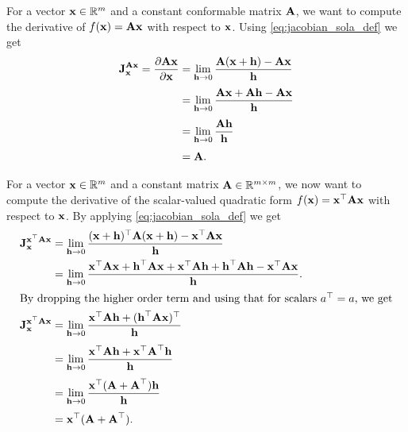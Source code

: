\begin{example}[frametitle=Computing the Jacobian $\jac{\matA \vecx}{\vecx}$]
For a vector $\vecx \in \bbR^m$ and a constant conformable matrix $\matA$, we want to compute the derivative of $f(\vecx) = \matA \vecx$ with respect to $\vecx$.
Using \eqref{eq:jacobian_sola_def} we get
\begin{subequations}
\begin{align}
  \jac{\matA \vecx}{\vecx} = \dpar{\matA \vecx}{\vecx} 
  &= \lim_{\vech \to 0} \frac{\matA (\vecx + \vech) - \matA \vecx}{\vech}\\[0.3em]
  &= \lim_{\vech \to 0} \frac{\matA \vecx + \matA \vech - \matA \vecx}{\vech}\\[0.3em]
  &= \lim_{\vech \to 0} \frac{\matA \vech}{\vech}\\[0.3em]
  &= \matA.
\end{align}
\end{subequations}
\end{example}

\begin{example}[frametitle=Computing the Jacobian $\jac{\vecx\trans \matA \vecx}{\vecx}$]
For a vector $\vecx \in \bbR^m$ and a constant matrix $\matA \in \bbR^{m \times m}$, we now want to compute the derivative of the scalar-valued quadratic form $f(\vecx) = \vecx\trans \matA \vecx$ with respect to $\vecx$.
By applying \eqref{eq:jacobian_sola_def} we get
\begin{subequations} \label{eq:jacobian_quadratic_form}
\begin{align}
  \jac{\vecx\trans \matA \vecx}{\vecx}
  &= \lim_{\vech \to 0} \frac{(\vecx + \vech)\trans \matA (\vecx + \vech) - \vecx\trans \matA \vecx}{\vech}\\
  &= \lim_{\vech \to 0} \frac{\vecx\trans \matA \vecx + \vech\trans \matA \vecx + \vecx\trans \matA \vech + \vech\trans \matA \vech - \vecx\trans \matA \vecx}{\vech}.\\
\intertext{By dropping the higher order term and using that for scalars $a\trans = a$, we get}
  \jac{\vecx\trans \matA \vecx}{\vecx}
  &= \lim_{\vech \to 0} \frac{\vecx\trans \matA \vech + (\vech\trans \matA \vecx)\trans}{\vech}\\[0.3em]
  &= \lim_{\vech \to 0} \frac{\vecx\trans \matA \vech + \vecx\trans \matA\trans \vech}{\vech}\\[0.3em]
  &= \lim_{\vech \to 0} \frac{\vecx\trans (\matA + \matA\trans) \vech}{\vech}\\[0.3em]
  &= \vecx\trans (\matA + \matA\trans).
\end{align}
\end{subequations}
\end{example}

